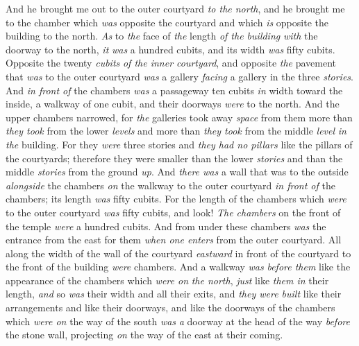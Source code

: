 \begin{biblechapter} %
 And he brought me out to the outer courtyard \textit{to the north}, and he brought me to the chamber which \textit{was} opposite the courtyard and which \textit{is} opposite the building to the north.
\verse \textit{As} to \textit{the} face of \textit{the} length \textit{of the building} \textit{with} the doorway to the north, \textit{it} \textit{was} a hundred cubits, and its width \textit{was} fifty cubits.
\verse Opposite the twenty \textit{cubits} \textit{of the inner courtyard}, and opposite \textit{the} pavement that \textit{was} to the outer courtyard \textit{was} a gallery \textit{facing} a gallery in the three \textit{stories}.
\verse And \textit{in front of} the chambers \textit{was} a passageway ten cubits \textit{in} width toward the inside, a walkway of one cubit, and their doorways \textit{were} to the north.
\verse And the upper chambers narrowed, for \textit{the} galleries took away \textit{space} from them more than \textit{they took} from the lower \textit{levels} and more than \textit{they took} from the middle \textit{level} \textit{in the} building.
\verse For they \textit{were} three stories and \textit{they had no pillars} like the pillars of the courtyards; therefore they were smaller than the lower \textit{stories} and than the middle \textit{stories} from the ground \textit{up}.
\verse And \textit{there was} a wall that was to the outside \textit{alongside} the chambers \textit{on} the walkway to the outer courtyard \textit{in front of} the chambers; its length \textit{was} fifty cubits.
\verse For the length of the chambers which \textit{were} to the outer courtyard \textit{was} fifty cubits, and look! \textit{The chambers} on the front of the temple \textit{were} a hundred cubits.
\verse And from under these chambers \textit{was} the entrance from the east for them \textit{when one enters} from the outer courtyard.
\verse All along the width of the wall of the courtyard \textit{eastward} in front of the courtyard to the front of the building \textit{were} chambers.
\verse And a walkway \textit{was} \textit{before them} like the appearance of the chambers which \textit{were on} \textit{the north}, \textit{just} like \textit{them in} their length, \textit{and} so \textit{was} their width and all their exits, and \textit{they were built} like their arrangements and like their doorways,
\verse and like the doorways of the chambers which \textit{were on} the way of the south \textit{was} \textit{a} doorway at the head of the way \textit{before} the stone wall, projecting \textit{on} the way of the east at their coming.

\end{biblechapter}
